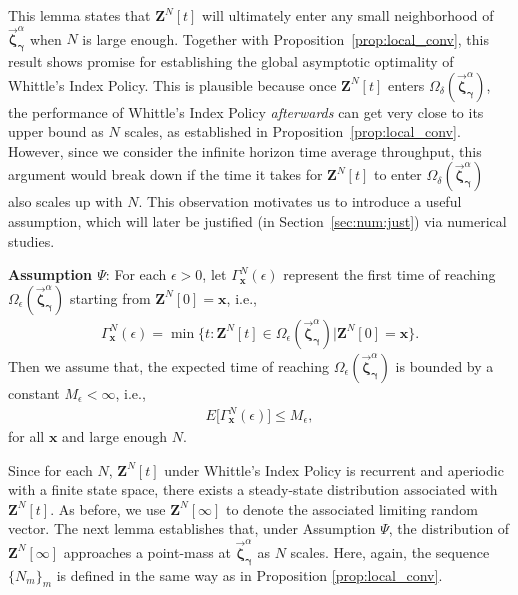 \documentclass[11pt,twocolumn]{IEEEtran}
\begin{document}
This lemma states that ${\bm Z}^N[t]$ will ultimately enter any
small neighborhood of $\vec{\bm \zeta}^{\alpha}_{\bm \gamma}$ when
$N$ is large enough. Together with
Proposition~\ref{prop:local_conv}, this result shows promise for
establishing the global asymptotic optimality of Whittle's Index
Policy. This is plausible because once ${\bm Z}^N[t]$ enters
$\Omega_{\delta}(\vec{\bm \zeta}^{\alpha}_{\bm \gamma})$, the
performance of Whittle's Index Policy \emph{afterwards} can
get very close to its upper bound as $N$ scales, as established in
Proposition~\ref{prop:local_conv}. However, since we consider the infinite horizon time average throughput, this argument would break down if the time it takes for ${\bm Z}^N[t]$ to enter $\Omega_{\delta}(\vec{\bm \zeta}^{\alpha}_{\bm \gamma})$ also scales
up with $N$. This observation
motivates us to introduce a useful assumption, which will later be justified
(in Section~\ref{sec:num:just}) via numerical studies.

\vspace{5pt}



\noindent \textbf{Assumption $\Psi$}: For each $\epsilon{>}0$, let
$\Gamma_{\bm x}^N(\epsilon)$ represent the first time of reaching
$\Omega_{\epsilon}(\vec{\bm \zeta}^{\alpha}_{\bm \gamma})$ starting
from ${\bm Z}^N[0]= {\bm x}$, i.e.,
\begin{align}
\Gamma_{\bm x}^N(\epsilon)=\min \{t: {\bm Z}^N[t] \in
\Omega_{\epsilon}(\vec{\bm \zeta}^{\alpha}_{\bm \gamma}) \big | {\bm
Z}^N[0]= {\bm x} \}. \nonumber
\end{align}
Then we assume that, the expected time of reaching
$\Omega_{\epsilon}(\vec{\bm \zeta}^{\alpha}_{\bm \gamma})$ is
bounded by a constant $M_{\epsilon}{<}\infty$, i.e.,
\begin{align}
E\big[\Gamma_{\bm x}^N
(\epsilon)\big]{\leq}M_{\epsilon},\nonumber
\end{align}
for all $\bm x$ and large enough $N$.

\vspace{7pt}

Since for each $N$, ${\bm Z}^N[t]$ under Whittle's Index Policy is
recurrent and aperiodic with a finite state space, there exists a
steady-state distribution associated with ${\bm Z}^N[t]$. As before,
we use ${\bm Z}^N[\infty]$ to denote the associated limiting random
vector. The next lemma establishes that, under Assumption $\Psi$, the
distribution of ${\bm Z}^N[\infty]$ approaches a point-mass at
$\vec{\bm \zeta}^{\alpha}_{\bm \gamma}$ as $N$ scales. Here, again,
the sequence $\{N_m\}_m$ is defined in the same way as in
Proposition \ref{prop:local_conv}.
\end{document}
